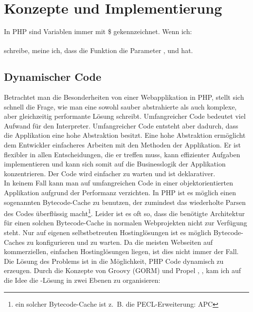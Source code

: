 \chapter{Konzepte und Implementierung}

\begin{anmerkung}
In PHP sind Variablen immer mit \$ gekennzeichnet. Wenn ich: \\
\\
schreibe, meine ich, dass die Funktion  die Parameter ,  und  hat.
\end{anmerkung}

\section{Dynamischer Code} \label{dynamischer-code}
Betrachtet man die Besonderheiten von einer Webapplikation in PHP, stellt sich schnell die Frage, wie man eine sowohl sauber abstrahierte als auch komplexe, aber gleichzeitig performante Lösung schreibt. Umfangreicher Code bedeutet viel Aufwand für den Interpreter. Umfangreicher Code entsteht aber dadurch, dass die Applikation eine hohe Abstraktion besitzt. Eine hohe Abstraktion ermöglicht dem Entwickler einfacheres Arbeiten mit den Methoden der Applikation. Er ist flexibler in allen Entscheidungen, die er treffen muss, kann effizienter Aufgaben implementieren und kann sich somit auf die Businesslogik der Applikation konzentrieren. Der Code wird einfacher zu warten und ist deklarativer. \\
In keinem Fall kann man auf umfangreichen Code in einer objektorientierten Applikation aufgrund der Performanz verzichten. In PHP ist es möglich einen sogenannten Bytecode-Cache zu benutzen, der zumindest das wiederholte Parsen des Codes überflüssig macht\footnote{ein solcher Bytecode-Cache ist z.~B. die PECL-Erweiterung: APC}. Leider ist es oft so, dass die benötigte Architektur für einen solchen Bytecode-Cache in normalen Webprojekten nicht zur Verfügung steht. Nur auf eigenen selbstbetreuten Hostinglösungen ist es möglich Bytecode-Caches zu konfigurieren und zu warten. Da die meisten Webseiten auf kommerziellen, einfachen Hostinglösungen liegen, ist dies nicht immer der Fall. \\
Die Lösung des Problems ist in \PSCORM die Möglichkeit, PHP Code dynamisch zu erzeugen. Durch die Konzepte von Groovy (GORM) und Propel \cite{propel}, \cite{orm-dynamic-languages}, kam ich auf die Idee die \ORM-Lösung in zwei Ebenen zu organisieren:\\

